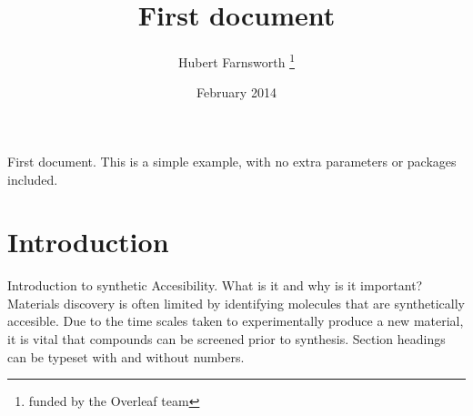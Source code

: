 \documentclass{article}
\title{First document}
\author{Hubert Farnsworth \thanks{funded by the Overleaf team}}
\date{February 2014}
\begin{document}
First document. This is a simple example, with no 
extra parameters or packages included.
\section{Introduction}
Introduction to synthetic Accesibility.
What is it and why is it important?
Materials discovery is often limited by identifying molecules that are synthetically accesible. Due to the time scales taken to experimentally produce a new material,
it is vital that compounds can be screened prior to synthesis.
Section headings can be typeset with and without numbers.
\end{document}
